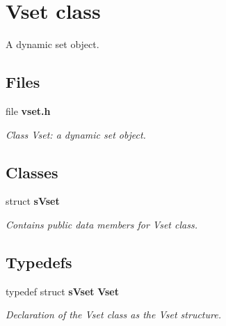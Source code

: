 \section{Vset class}
\label{a00030}


A dynamic set object.  


\subsection*{Files}
\begin{DoxyCompactItemize}
\item 
file {\bf vset.\+h}
\begin{DoxyCompactList}\small\item\em Class Vset\+: a dynamic set object. \end{DoxyCompactList}\end{DoxyCompactItemize}
\subsection*{Classes}
\begin{DoxyCompactItemize}
\item 
struct {\bf s\+Vset}
\begin{DoxyCompactList}\small\item\em Contains public data members for Vset class. \end{DoxyCompactList}\end{DoxyCompactItemize}
\subsection*{Typedefs}
\begin{DoxyCompactItemize}
\item 
typedef struct {\bf s\+Vset} {\bf Vset}
\begin{DoxyCompactList}\small\item\em Declaration of the Vset class as the Vset structure. \end{DoxyCompactList}\end{DoxyCompactItemize}
